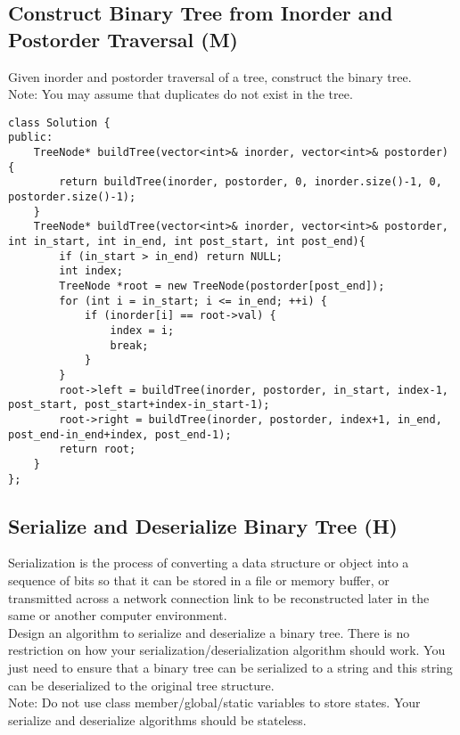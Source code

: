 \subsection{Construct Binary Tree from Inorder and Postorder Traversal (M)}
Given inorder and postorder traversal of a tree, construct the binary tree. \\

Note: You may assume that duplicates do not exist in the tree. \\

\begin{lstlisting}
class Solution {
public:
    TreeNode* buildTree(vector<int>& inorder, vector<int>& postorder) {
        return buildTree(inorder, postorder, 0, inorder.size()-1, 0, postorder.size()-1);
    }
    TreeNode* buildTree(vector<int>& inorder, vector<int>& postorder, int in_start, int in_end, int post_start, int post_end){
        if (in_start > in_end) return NULL;
        int index;
        TreeNode *root = new TreeNode(postorder[post_end]);
        for (int i = in_start; i <= in_end; ++i) {
            if (inorder[i] == root->val) {
                index = i;
                break;
            }
        }
        root->left = buildTree(inorder, postorder, in_start, index-1, post_start, post_start+index-in_start-1);
        root->right = buildTree(inorder, postorder, index+1, in_end, post_end-in_end+index, post_end-1);
        return root;
    }
};
\end{lstlisting}


\subsection{Serialize and Deserialize Binary Tree (H)}
Serialization is the process of converting a data structure or object into a sequence of bits so that it can be stored in a file or memory buffer, or transmitted across a network connection link to be reconstructed later in the same or another computer environment.\\

Design an algorithm to serialize and deserialize a binary tree. There is no restriction on how your serialization/deserialization algorithm should work. You just need to ensure that a binary tree can be serialized to a string and this string can be deserialized to the original tree structure.\\

Note: Do not use class member/global/static variables to store states. Your serialize and deserialize algorithms should be stateless. \\

